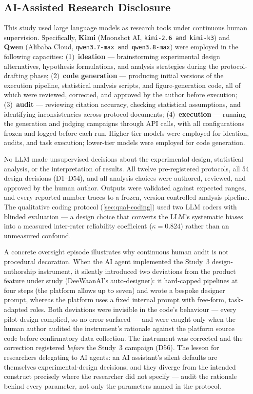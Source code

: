 \documentclass[12pt,a4paper]{article}
\begin{document}
\subsection{AI-Assisted Research Disclosure}\label{sec:ai-disclosure}

This study used large language models as research tools under continuous human
supervision. Specifically, \textbf{Kimi} (Moonshot AI, \texttt{kimi-2.6 and kimi-k3}) and
\textbf{Qwen} (Alibaba Cloud, \texttt{qwen3.7-max and qwen3.8-max}) were employed in the
following capacities: (1)~\textbf{ideation} --- brainstorming experimental
design alternatives, hypothesis formulations, and analysis strategies during the
protocol-drafting phase; (2)~\textbf{code generation} --- producing initial
versions of the execution pipeline, statistical analysis scripts, and
figure-generation code, all of which were reviewed, corrected, and approved by
the author before execution; (3)~\textbf{audit} --- reviewing citation accuracy,
checking statistical assumptions, and identifying inconsistencies across
protocol documents; (4)~\textbf{execution} --- running the generation and
judging campaigns through API calls, with all configurations frozen and logged
before each run. Higher-tier models were employed for ideation, audits, and
task execution; lower-tier models were employed for code generation.

No LLM made unsupervised decisions about the experimental design, statistical
analysis, or the interpretation of results. All twelve pre-registered protocols,
all 54 design decisions (D1--D54), and all analysis choices were authored,
reviewed, and approved by the human author. Outputs were
validated against expected ranges, and every reported number traces to a frozen,
version-controlled analysis pipeline. The qualitative coding protocol
(\cref{sec:qual-coding}) used two LLM coders with blinded evaluation --- a
design choice that converts the LLM's systematic biases into a measured
inter-rater reliability coefficient ($\kappa = 0.824$) rather than an unmeasured
confound.

A concrete oversight episode illustrates why continuous human audit is not
procedural decoration. When the AI agent implemented the Study~3
design-authorship instrument, it silently introduced two deviations from the
product feature under study (DeeWaanAI's auto-designer): it hard-capped
pipelines at four steps (the platform allows up to seven) and wrote a bespoke
designer prompt, whereas the platform uses a fixed internal prompt with
free-form, task-adapted roles. Both deviations were invisible in the code's
behaviour --- every pilot design complied, so no error surfaced --- and were
caught only when the human author audited the instrument's rationale against
the platform source code before confirmatory data collection. The instrument
was corrected and the correction registered \emph{before} the Study~3
campaign (D56). The lesson for researchers delegating to AI agents: an AI
assistant's silent defaults are themselves experimental-design decisions, and
they diverge from the intended construct precisely where the researcher did
not specify --- audit the rationale behind every parameter, not only the
parameters named in the protocol.
\end{document}

